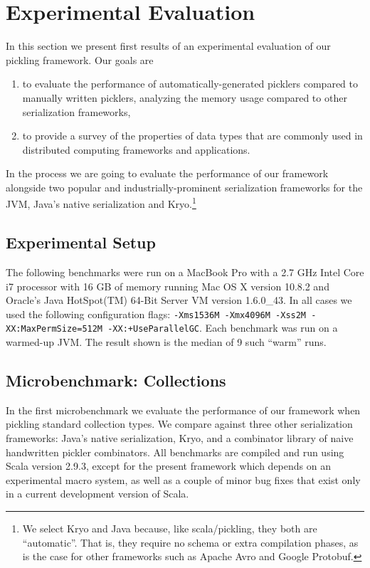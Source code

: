 \documentclass[preprint,10pt]{sigplanconf}
\theoremstyle{definition}
\theoremstyle{definition}
\begin{document}
\section{Experimental Evaluation}
\label{sec:evaluation}

In this section we present first results of an experimental evaluation
of our pickling framework. Our goals are
\begin{enumerate}
\item to evaluate the performance of automatically-generated picklers
  compared to manually written picklers, analyzing the memory usage
  compared to other serialization frameworks,
\item to provide a survey of the properties of data types that are
  commonly used in distributed computing frameworks and applications.
\end{enumerate}\noindent
In the process we are going to evaluate the performance of our
framework alongside two popular and industrially-prominent serialization frameworks
for the JVM, Java's native serialization and Kryo.\footnote{We select Kryo and Java because, like scala/pickling, they both are ``automatic''. That is, they require no schema or extra compilation phases, as is the case for other frameworks such as Apache Avro and Google Protobuf.}

\subsection{Experimental Setup}

The following benchmarks were run on a MacBook Pro with a 2.7 GHz
Intel Core i7 processor with 16 GB of memory running Mac OS X version
10.8.2 and Oracle's Java HotSpot(TM) 64-Bit Server VM version
1.6.0\_43. In all cases we used the following configuration flags:
\texttt{-Xms1536M -Xmx4096M -Xss2M -XX:MaxPermSize=512M -XX:+UseParallelGC}. Each benchmark was run on a warmed-up JVM. The result shown is the median of 9 such ``warm'' runs.

\subsection{Microbenchmark: Collections}

In the first microbenchmark we evaluate the performance of our
framework when pickling standard collection types. We compare against
three other serialization frameworks: Java's native serialization,
Kryo, and a combinator library of naive handwritten pickler combinators. All
benchmarks are compiled and run using Scala version 2.9.3, except for
the present framework which depends on an experimental macro system,
as well as a couple of minor bug fixes that exist only in a current
development version of Scala.
\end{document}
